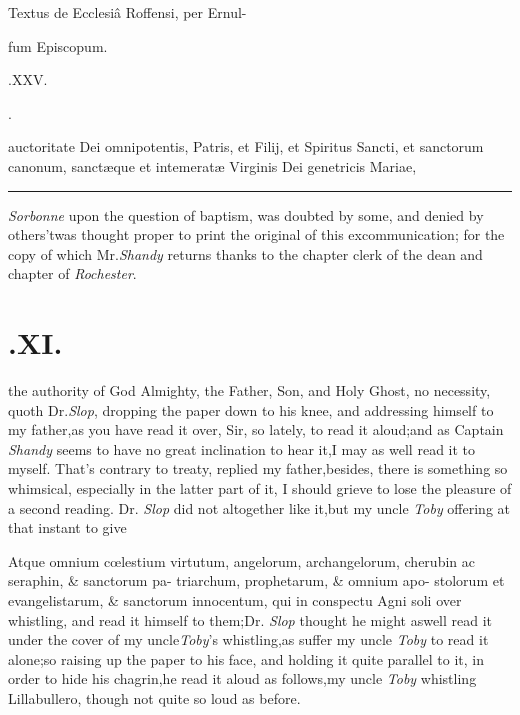 \documentclass{article}
\begin{document}
\centerline{Textus de Ecclesiâ Roffensi, per Ernul-}
\centerline{fum Episcopum.}
\bigskip
\bigskip
\centerline{\large{}.\quad XXV.}
\bigskip
\centerline{\large{}.}

 auctoritate Dei omnipotentis, Patris, et Filij, et Spiritus Sancti, et
sanctorum canonum, sanctæque et intemeratæ Virginis Dei genetricis Mariae,

\vfill
\bgroup\fontsize{8}{10}\selectfont
\hrule
{} \textit{Sor\-bonne} upon the question of
baptism, was doubted by some, and denied by others\tsh ’twas
thought proper to print the original of this excommunication; for the copy of
which Mr.\@ \textit{Shandy} returns thanks to the chapter clerk of the dean and
chapter of \textit{Rochester}.\par
\egroup
{}
\newpage
\def\alt#1#2{\hbox{\vbox to
3.6ex{\vss\openup-7pt\halign{##\cr\hss\tiny #2\hss\cr#1\cr}}}}
\def\c#1{\hbox to 0pt{\hss #1\hss}}
\section{.\quad  XI.}

the authority of God Almighty, the Father, Son, and Holy Ghost,
no necessity, quoth Dr.\@ \textit{Slop}, dropping the paper down to his knee, and
addressing himself to my father,\tsh as you have read it over, Sir, so lately, to
read it aloud;\tsk\break and as Captain \textit{Shandy} seems to have no great inclination
to hear it,\tsh I may as well read it to myself. That’s contrary to treaty, replied
my father,\tsk besides, there is something so whimsical, especially in the latter
part of it, I should grieve to lose the pleasure of a second reading.  Dr.\@
\textit{Slop} did not altogether like it,\tsh but my uncle \textit{Toby} offering at
that instant to give

\null\vfill
\quad\tsh Atque omnium cœlestium\break
virtutum, angelorum, archangelorum,\break
{}\break
cherubin ac seraphin, \& sanctorum pa-\break
triarchum, prophetarum, \& omnium apo-\break
stolorum et evangelistarum, \& sanctorum\break
innocentum, qui in conspectu Agni soli
over whistling, and read it himself to them;\tsh Dr.\@
\textit{Slop} thought he might as\break well read it under the cover
of my uncle\break \textit{Toby}’s whistling,\tsk as suffer my uncle
\textit{Toby} to read it alone;\tsh so raising up the paper to
his face, and holding it quite parallel to it, in order to hide
his chagrin,\tsk\break he read it aloud as follows,\tsh my uncle
\textit{Toby} whistling Lillabullero, though not quite so loud
as before.
\end{document}
